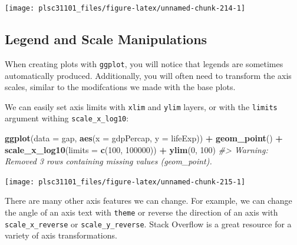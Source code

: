 \documentclass[]{book}
\newenvironment{Shaded}{\begin{snugshade}}{\end{snugshade}}
\newcommand{\KeywordTok}[1]{\textcolor[rgb]{0.13,0.29,0.53}{\textbf{#1}}}
\newcommand{\DataTypeTok}[1]{\textcolor[rgb]{0.13,0.29,0.53}{#1}}
\newcommand{\DecValTok}[1]{\textcolor[rgb]{0.00,0.00,0.81}{#1}}
\newcommand{\StringTok}[1]{\textcolor[rgb]{0.31,0.60,0.02}{#1}}
\newcommand{\CommentTok}[1]{\textcolor[rgb]{0.56,0.35,0.01}{\textit{#1}}}
\newcommand{\OperatorTok}[1]{\textcolor[rgb]{0.81,0.36,0.00}{\textbf{#1}}}
\newcommand{\NormalTok}[1]{#1}
\begin{document}
\begin{center}\texttt{[image: plsc31101\_files/figure-latex/unnamed-chunk-214-1]} \end{center}

\subsection{Legend and Scale
Manipulations}\label{legend-and-scale-manipulations}

When creating plots with \texttt{ggplot}, you will notice that legends
are sometimes automatically produced. Additionally, you will often need
to transform the axis scales, similar to the modifcations we made with
the base plots.

We can easily set axis limits with \texttt{xlim} and \texttt{ylim}
layers, or with the \texttt{limits} argument withing
\texttt{scale\_x\_log10}:

\begin{Shaded}
\begin{Highlighting}[]
\KeywordTok{ggplot}\NormalTok{(}\DataTypeTok{data =}\NormalTok{ gap, }\KeywordTok{aes}\NormalTok{(}\DataTypeTok{x =}\NormalTok{ gdpPercap, }\DataTypeTok{y =}\NormalTok{ lifeExp)) }\OperatorTok{+}
\StringTok{  }\KeywordTok{geom_point}\NormalTok{() }\OperatorTok{+}\StringTok{ }
\StringTok{  }\KeywordTok{scale_x_log10}\NormalTok{(}\DataTypeTok{limits =} \KeywordTok{c}\NormalTok{(}\DecValTok{100}\NormalTok{, }\DecValTok{100000}\NormalTok{)) }\OperatorTok{+}
\StringTok{  }\KeywordTok{ylim}\NormalTok{(}\DecValTok{0}\NormalTok{, }\DecValTok{100}\NormalTok{)}
\CommentTok{#> Warning: Removed 3 rows containing missing values (geom_point).}
\end{Highlighting}
\end{Shaded}

\begin{center}\texttt{[image: plsc31101\_files/figure-latex/unnamed-chunk-215-1]} \end{center}

There are many other axis features we can change. For example, we can
change the angle of an axis text with \texttt{theme} or reverse the
direction of an axis with \texttt{scale\_x\_reverse} or
\texttt{scale\_y\_reverse}. Stack Overflow is a great resource for a
variety of axis transformations.
\end{document}
